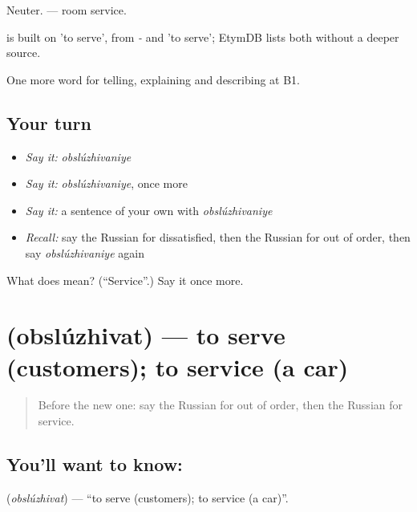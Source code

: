 Neuter. \emph{ } — room service.

\begin{cousinweb}
\emph{} is built on \emph{} 'to serve', from \emph{-} and \emph{} 'to serve'; EtymDB lists both without a deeper source.
\end{cousinweb}

\begin{grammarlens}[title={What you've built}]
One more word for telling, explaining and describing at B1.
\end{grammarlens}

\subsection*{Your turn}
\begin{itemize}
\raggedright
  \item \emph{Say it:} \emph{obslúzhivaniye}
  \item \emph{Say it:} \emph{obslúzhivaniye}, once more
  \item \emph{Say it:} a sentence of your own with \emph{obslúzhivaniye}
  \item \emph{Recall:} say the Russian for dissatisfied, then the Russian for out of order, then say \emph{obslúzhivaniye} again
\end{itemize}

\begin{tcolorbox}[breakable,colback=teal!4,colframe=teal!35!black,title={Before you move on}]
What does  mean? (\textquotedblleft{}Service\textquotedblright{}.) Say it once more.
\end{tcolorbox}
\section[\texorpdfstring{\ru{обслуживать} (obslúzhivat)}{обслуживать (obslúzhivat)}]{ (obslúzhivat) — to serve (customers); to service (a car)}

\label{lesson:RU-C435-obsluzhivat}



\begin{quote}
Before the new one: say the Russian for out of order, then the Russian for service.
\end{quote}

\subsection*{You'll want to know: }
\textbf{} (\emph{obslúzhivat}) — \textquotedblleft{}to serve (customers); to service (a car)\textquotedblright{}.

